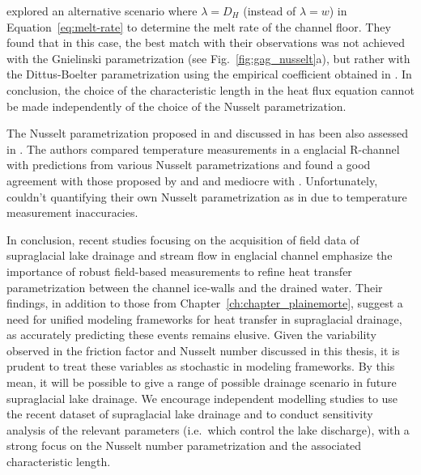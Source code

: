 \cite{Gagliardini&al2024} explored an alternative scenario where $\lambda = D_H$ (instead of $\lambda = w$) in Equation~\ref{eq:melt-rate} to determine the melt rate of the channel floor. They found that in this case, the best match with their observations was not achieved with the Gnielinski parametrization (see Fig.~\ref{fig:gag_nusselt}a), but rather with the Dittus-Boelter parametrization using the empirical coefficient obtained in \cite{Ogier&al2021}. In conclusion, the choice of the characteristic length in the heat flux equation cannot be made independently of the choice of the Nusselt parametrization. 


The Nusselt parametrization proposed in \cite{Ogier&al2021} and discussed in \cite{Gagliardini&al2024} has been also assessed in \cite{pohle&&2022}. The authors compared temperature measurements in a englacial R-channel with predictions from various Nusselt parametrizations \citep{Lunardini&al1986, Clarke2003, Vincent&al2010, Sommers&Rajaram2020, Ogier&al2021} and found a good agreement with those proposed by \cite{Ogier&al2021} and \cite{Vincent&al2010} and mediocre with \cite{Lunardini&al1986,Clarke2003,Sommers&Rajaram2020}. Unfortunately, \cite{pohle&&2022} couldn't quantifying their own Nusselt parametrization as in \cite{Ogier&al2021} due to temperature measurement inaccuracies. 

In conclusion, recent studies focusing on the acquisition of field data of supraglacial lake drainage \citep{Gagliardini&al2024} and stream flow in englacial channel \citep{pohle&&2022} emphasize the importance of robust field-based measurements to refine heat transfer parametrization between the channel ice-walls and the drained water. Their findings, in addition to those from Chapter~\ref{ch:chapter_plainemorte}, suggest a need for unified modeling frameworks for heat transfer in supraglacial drainage, as accurately predicting these events remains elusive. Given the variability observed in the friction factor and Nusselt number discussed in this thesis, it is prudent to treat these variables as stochastic in modeling frameworks. By this mean, it will be possible to give a range of possible drainage scenario in future supraglacial lake drainage. We encourage independent modelling studies \citep[e.g.][]{Jarosch&Gudmundsson2012,Kingslake&al2015} to use the recent dataset of supraglacial lake drainage \citep[e.g.][]{Vincent&al2010,Ogier&al2021,Gagliardini&al2024} and to conduct sensitivity analysis of the relevant parameters (i.e.\ which control the lake discharge), with a strong focus on the Nusselt number parametrization and the associated characteristic length. 


